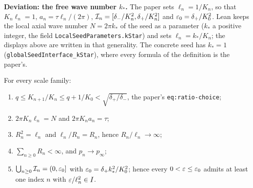 \textbf{Deviation: the free wave number $k_* $.}  The paper sets $\ell_n=1/K_n $, so that
$K_n\ell_n=1 $, $a_n=\tau\ell_n/(2\pi) $, $\mathcal{I}_n=[\delta_-/K_n^2,\delta_+/K_n^2] $ and
$\varepsilon_0=\delta_+/K_0^2 $.  Lean keeps the local axial wave number $N=2\pi k_* $ of the seed
as a parameter ($k_* $ a positive integer, the field \texttt{LocalSeedParameters.kStar}) and
sets $\ell_n=k_*/K_n $; the displays above are written in that generality.  The concrete
seed has $k_*=1 $ (\texttt{globalSeedInterface\_kStar}), where every formula of the definition is the
paper's.

\begin{lemma}
  \label{lem:velocity:scale-arithmetic}
  \leanok
  For every scale family:
  \begin{enumerate}
    \item $q\leq K_{n+1}/K_n\leq q+1/K_0<\sqrt{\delta_+/\delta_-} $, the paper's
      \texttt{eq:ratio-choice};
    \item $2\pi K_n\ell_n=N $ and $2\pi K_na_n=\tau $;
    \item $R_n^2=\ell_n $ and $\ell_n/R_n=R_n $, hence $R_n/\ell_n\to\infty $;
    \item $\sum_{n\geq0}R_n<\infty $, and $p_n\to p_\infty $;
    \item $\bigcup_{n\geq0}\mathcal{I}_n=(0,\varepsilon_0] $ with $\varepsilon_0=\delta_+k_*^2/K_0^2 $; hence
      every $0<\varepsilon\leq\varepsilon_0 $ admits at least one index $n $ with $\varepsilon/\ell_n^2\in I $.
  \end{enumerate}
\end{lemma}

